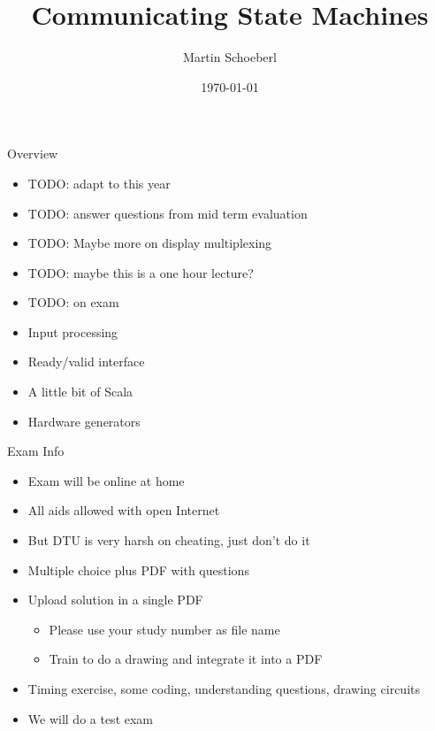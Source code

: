 

\newif\ifbook


\title{Communicating State Machines}
\author{Martin Schoeberl}
\date{\today}



\begin{frame}
\titlepage
\end{frame}

\begin{frame}[fragile]{Overview}
\begin{itemize}
\item TODO: adapt to this year
\item TODO: answer questions from mid term evaluation
\item TODO: Maybe more on display multiplexing
\item TODO: maybe this is a one hour lecture?
\item TODO: on exam
\item Input processing
\item Ready/valid interface
\item A little bit of Scala
\item Hardware generators
\end{itemize}
\end{frame}

\begin{frame}[fragile]{Exam Info}
\begin{itemize}
\item Exam will be online at home
\item All aids allowed with open Internet
\item But DTU is very harsh on cheating, just don't do it
\item Multiple choice plus PDF with questions
\item Upload solution in a single PDF
\begin{itemize}
\item Please use your study number as file name
\item Train to do a drawing and integrate it into a PDF
\end{itemize}
\item Timing exercise, some coding, understanding questions, drawing circuits
\item We will do a test exam
\end{itemize}
\end{frame}

